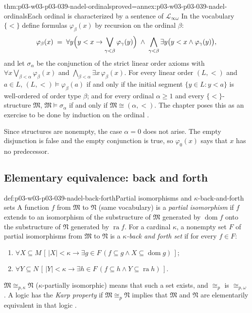 \begin{hbtheorem}{thm:p03-w03-p03-039-nadel-ordinals}{proved=annex:p03-w03-p03-039-nadel-ordinals}{Each ordinal is characterized by a sentence of \(\mathscr L_{\infty\omega}\)}
In the vocabulary \(\{<\}\) define formulas \(\varphi_\beta(x)\) by recursion
on the ordinal \(\beta\):
\[
\varphi_\beta(x)\;=\;\forall y\Bigl(y<x\to\bigvee_{\gamma<\beta}\varphi_\gamma(y)\Bigr)\;\wedge\;\bigwedge_{\gamma<\beta}\exists y\bigl(y<x\wedge\varphi_\gamma(y)\bigr),
\]
and let \(\sigma_\alpha\) be the conjunction of the strict linear order axioms
with \(\forall x\bigvee_{\beta<\alpha}\varphi_\beta(x)\) and
\(\bigwedge_{\beta<\alpha}\exists x\,\varphi_\beta(x)\). For every linear order
\((L,<)\) and \(a\in L\), \((L,<)\models\varphi_\beta(a)\) if and only if the
initial segment \(\{y\in L:y<a\}\) is well-ordered of order type \(\beta\);
and for every ordinal \(\alpha\ge1\) and every \(\{<\}\)-structure
\(\mathfrak M\), \(\mathfrak M\models\sigma_\alpha\) if and only if
\(\mathfrak M\cong(\alpha,<)\). The chapter poses this as an exercise to be
done by induction on the ordinal \cite[p.~274]{Nadel1985Admissible}.
\end{hbtheorem}

Since structures are nonempty, the case \(\alpha=0\) does not arise. The
empty disjunction is false and the empty conjunction is true, so
\(\varphi_0(x)\) says that \(x\) has no predecessor.

\subsection{Elementary equivalence: back and forth}
\label{sec:p03-w03-p03-039-nadel-equivalence}

\begin{hbdefinition}{def:p03-w03-p03-039-nadel-back-forth}{Partial isomorphisms and \(\kappa\)-back-and-forth sets}
A function \(f\) from \(\mathfrak M\) to \(\mathfrak N\) (same vocabulary) is
a \emph{partial isomorphism} if \(f\) extends to an isomorphism of the
substructure of \(\mathfrak M\) generated by \(\operatorname{dom}f\) onto the
substructure of \(\mathfrak N\) generated by \(\operatorname{ra}f\). For a
cardinal \(\kappa\), a nonempty set \(F\) of partial isomorphisms from \(\mathfrak M\)
to \(\mathfrak N\) is a \emph{\(\kappa\)-back and forth set} if for every
\(f\in F\):
\begin{enumerate}
\item[(i)] \(\forall X\subseteq M\,[\,\lvert X\rvert<\kappa\to\exists g\in F\,(f\subseteq g\wedge X\subseteq\operatorname{dom}g)\,]\);
\item[(ii)] \(\forall Y\subseteq N\,[\,\lvert Y\rvert<\kappa\to\exists h\in F\,(f\subseteq h\wedge Y\subseteq\operatorname{ra}h)\,]\).
\end{enumerate}
\(\mathfrak M\cong_{p,\kappa}\mathfrak N\) (\(\kappa\)-partially isomorphic)
means that such a set exists, and \(\cong_p\) is \(\cong_{p,\omega}\). A logic
has the \emph{Karp property} if \(\mathfrak M\cong_p\mathfrak N\) implies
that \(\mathfrak M\) and \(\mathfrak N\) are elementarily equivalent in that
logic \cite[\S~2.1, pp.~276--277]{Nadel1985Admissible}.
\end{hbdefinition}

